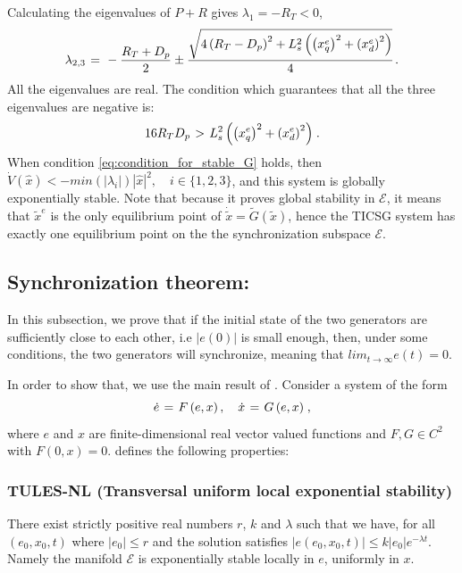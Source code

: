 \documentclass[letterpaper, 10 pt, conference]{ieeeconf}
\renewcommand{\l}    {{\lambda}}
\newcommand{\m}      {{\hbox{\hskip 1pt}}}
\begin{document}
Calculating the eigenvalues of $P+R$ gives \m $\l_{1}=-R_T<0$,
$$ \l_{2,3} \m=\m -\frac{R_T+D_p}{2} \pm\frac{\sqrt{4\left(R_T-D_p
   \right)^2+L_s^2\left(\left(x_q^e\right)^2 + \left(x_d^e
   \right)^2\right)}}{4} \m.$$
All the eigenvalues are real. The condition which guarantees that
all the three eigenvalues are negative is:
\begin{equation} \label{eq:condition_for_stable_G}
   16 R_T D_p \m>\m L_s^2 \left( \left(x_q^e\right)^2+\left( x_d^e
   \right)^2\right) \m.
\end{equation}
When condition \eqref{eq:condition_for_stable_G} holds, then
$\dot{V}(\hat{x})<-min\left(\left|\lambda_{i}\right|\right)|
\hat{x}|^{2},\quad i\in\{1,2,3\}$, and this system is globally
exponentially stable. Note that because it proves global stability in
$\mathscr{E}$, it means that $\tilde{x}^{e}$ is the only equilibrium
point of $\dot{\tilde{x}}=\tilde{G}(\tilde{x})$, hence the TICSG
system has exactly one equilibrium point on the the synchronization
subspace $\mathscr{E}$.

\subsection{Synchronization theorem:}
 
In this subsection, we prove that if the initial state of the two generators
are sufficiently close to each other, i.e $|e(0)|$ is small enough, then, under some conditions, the two generators will synchronize, meaning that $lim_{t\to\infty}e(t)=0$.

In order to show that, we use the main result of 
\cite{AndrieuJayawardhanaPraly}. Consider a system of the form 
\begin{equation} \label{eq:systemForm}
   \dot{e} \m=\m F\left(e,x\right),\quad \dot{x} \m=\m
   G\left(e,x\right) \m,
\end{equation}
where $e$ and $x$ are finite-dimensional real vector valued functions
and $F, G \in C^2$ with $F(0,x)=0$. \cite{AndrieuJayawardhanaPraly}
defines the following properties:

\subsubsection{TULES-NL (Transversal uniform local exponential stability)}
There exist strictly positive real numbers $r$, $k$ and $\lambda$ such that we have, for all $\left(e_0, x_0, t\right)$  where $\left| e_0\right| \le r$ and the solution satisfies $\left|e\left(e_0, x_0, t\right)\right| \le k\left|e_0\right| e^{-\lambda t}$. Namely the manifold $\mathscr{E}$ is exponentially stable locally in $e$, uniformly in $x$.
\end{document}

